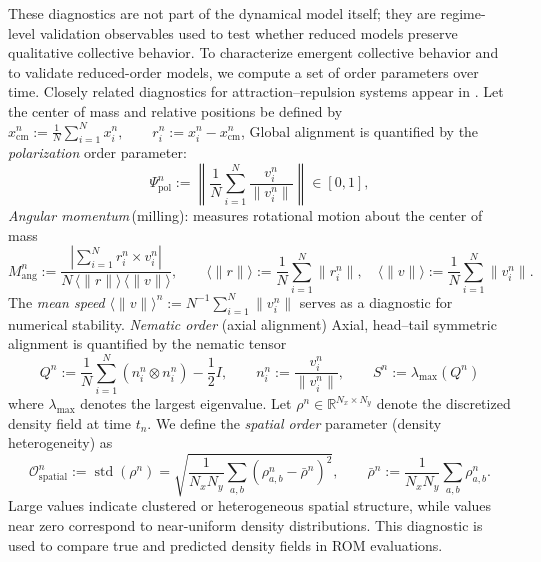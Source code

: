 These diagnostics are not part of the dynamical model itself; they are regime-level validation observables used to test whether reduced models preserve qualitative collective behavior.
To characterize emergent collective behavior and to validate reduced-order models,
we compute a set of order parameters over time.
Closely related diagnostics for attraction--repulsion systems appear in
\cite{bhaskar2019topology}. Let the center of mass and relative positions be defined by
$x_{\mathrm{cm}}^n := \frac{1}{N}\sum_{i=1}^N x_i^n,
\qquad
r_i^n := x_i^n - x_{\mathrm{cm}}^n$,
Global alignment is quantified by the \emph{polarization} order parameter:
\begin{equation}
\Psi_{\mathrm{pol}}^n
:= \left\|\frac{1}{N}\sum_{i=1}^N \frac{v_i^n}{\|v_i^n\|}\right\|
\in [0,1],
\label{eq:polarization}
\end{equation}
\emph{Angular momentum}\,(milling): measures rotational motion about the center of mass
\begin{equation}
M_{\mathrm{ang}}^n
:= \frac{\left|\sum_{i=1}^N r_i^n \times v_i^n\right|}
{N\,\langle\|r\|\rangle\,\langle\|v\|\rangle},
\qquad
\langle\|r\|\rangle := \frac{1}{N}\sum_{i=1}^N \|r_i^n\|,
\quad
\langle\|v\|\rangle := \frac{1}{N}\sum_{i=1}^N \|v_i^n\|.
\label{eq:angular_momentum}
\end{equation}
The \emph{mean speed} $\langle \|v\| \rangle^n := N^{-1}\sum_{i=1}^N \|v_i^n\|$
serves as a diagnostic for numerical stability.  \emph{Nematic order} (axial alignment)
Axial, head--tail symmetric alignment is quantified by the nematic tensor
\begin{equation}
Q^n := \frac{1}{N}\sum_{i=1}^N \left(n_i^n \otimes n_i^n\right) - \frac{1}{2}I,
\qquad
n_i^n := \frac{v_i^n}{\|v_i^n\|},
\qquad
S^n := \lambda_{\max}(Q^n)
\label{eq:nematic_tensor}
\end{equation}
where $\lambda_{\max}$ denotes the largest eigenvalue. Let $\rho^n \in \mathbb{R}^{N_x\times N_y}$ denote the discretized density field at time $t_n$.
We define the \emph{spatial order} parameter (density heterogeneity) as
\begin{equation}
\mathcal{O}_{\mathrm{spatial}}^n
:= \operatorname{std}\!\left(\rho^n\right)
= \sqrt{\frac{1}{N_x N_y}
\sum_{a,b}\left(\rho_{a,b}^n - \bar\rho^n\right)^2},
\qquad
\bar\rho^n := \frac{1}{N_x N_y}\sum_{a,b}\rho_{a,b}^n.
\label{eq:spatial_order}
\end{equation}
Large values indicate clustered or heterogeneous spatial structure,
while values near zero correspond to near-uniform density distributions.
This diagnostic is used to compare true and predicted density fields in ROM evaluations.

